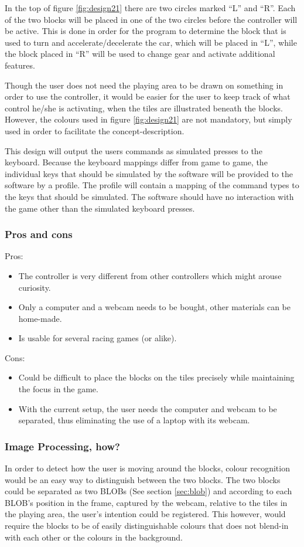 In the top of figure \ref{fig:design21} there are two circles marked “L” and “R”. Each of the two blocks will be placed in one of the two circles before the controller will be active. This is done in order for the program to determine the block that is used to turn and accelerate/decelerate the car, which will be placed in “L”, while the block placed in “R” will be used to change gear and activate additional features.

Though the user does not need the playing area to be drawn on something in order to use the controller, it would be easier for the user to keep track of what control he/she is activating, when the tiles are illustrated beneath the blocks. However, the colours used in figure \ref{fig:design21} are not mandatory, but simply used in order to facilitate the concept-description.
\bigskip

This design will output the users commands as simulated presses to the keyboard. 
Because the keyboard mappings differ from game to game, the individual keys that should be simulated by the software will be provided to the software by a profile.
The profile will contain a mapping of the command types to the keys that should be simulated. 
The software should have no interaction with the game other than the simulated keyboard presses.


\subsubsection*{Pros and cons}
Pros:
\begin{itemize}
\item The controller is very different from other controllers which might arouse curiosity.
\item Only a computer and a webcam needs to be bought, other materials can be home-made.
\item Is usable for several racing games (or alike).
\end{itemize}
Cons:
\begin{itemize}
\item Could be difficult to place the blocks on the tiles precisely while maintaining the focus in the game.
\item With the current setup, the user needs the computer and webcam to be separated, thus eliminating the use of a laptop with its webcam.
\end{itemize}

\subsubsection*{Image Processing, how?}
In order to detect how the user is moving around the blocks, colour recognition would be an easy way to distinguish between the two blocks. The two blocks could be separated as two BLOBs (See section \ref{sec:blob}) and according to each BLOB’s position in the frame, captured by the webcam, relative to the tiles in the playing area, the user’s intention could be registered. This however, would require the blocks to be of easily distinguishable colours that does not blend-in with each other or the colours in the background.